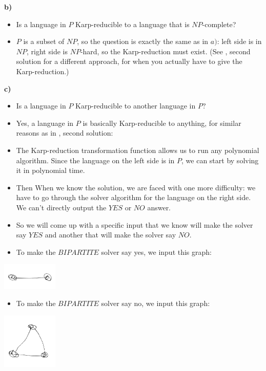 \textbf{b)}

\begin{itemize}
    \item Is a language in $P$ Karp-reducible to a language that is $NP$-complete?
    \item $P$ is a subset of $NP$, so the question is exactly the same as in $a)$: left side is in $NP$, right side is $NP$-hard, so the Karp-reduction must exist. (See , second solution for a different approach, for when you actually have to give the Karp-reduction.)
\end{itemize}

\textbf{c)}
\begin{itemize}
    \item Is a language in $P$ Karp-reducible to another language in $P$?
    \item Yes, a language in $P$ is basically Karp-reducible to anything, for similar reasons as in , second solution:
    \item The Karp-reduction transformation function allows us to run any polynomial algorithm. Since the language on the left side is in $P$, we can start by solving it in polynomial time.
    \item Then When we know the solution, we are faced with one more difficulty: we have to go through the solver algorithm for the language on the right side. We can't directly output the $YES$ or $NO$ answer.
    \item So we will come up with a specific input that we know will make the solver say $YES$ and another that will make the solver say $NO$.
    \item To make the $BIPARTITE$ solver say yes, we input this graph:
\end{itemize}

\begin{center}
\includegraphics[width=100px]{./08/06/bipartite_yes.png}
\end{center}

\begin{itemize}
    \item To make the $BIPARTITE$ solver say no, we input this graph:
\end{itemize}

\begin{center}
\includegraphics[width=100px]{./08/06/bipartite_no.png}
\end{center}